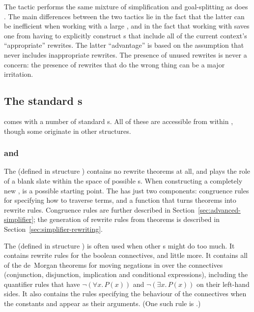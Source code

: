 The  tactic performs the same mixture of simplification and
goal-splitting as does .  The main differences between the
two tactics lie in the fact that the latter can be inefficient when
working with a large , and in the fact that working with
 saves one from having to explicitly construct
\simpset{}s that include all of the current context's ``appropriate''
rewrites.  The latter ``advantage'' is based on the assumption that
 never includes inappropriate rewrites.  The presence
of unused rewrites is never a concern: the presence of rewrites that
do the wrong thing can be a major irritation.

\subsection{The standard \simpset{}s}
\label{sec:standard-simpsets}

\HOL{} comes with a number of standard \simpset{}s.  All of these are
accessible from within , though some originate in other
structures.

\subsubsection{ and }
\label{sec:purebool-ss}
%
%
The  \simpset{} (defined in structure )
contains no rewrite theorems at all, and plays the role of a blank
slate within the space of possible \simpset{}s.  When constructing a
completely new \simpset,  is a possible starting point.
The  \simpset{} has just two components: congruence rules
for specifying how to traverse terms, and a function that turns
theorems into rewrite rules.  Congruence rules are further described
in Section~\ref{sec:advanced-simplifier}; the generation of rewrite
rules from theorems is described in
Section~\ref{sec:simplifier-rewriting}.

%
The  \simpset{} (defined in structure ) is
often used when other \simpset{}s might do too much.  It contains
rewrite rules for the boolean connectives, and little more.  It
contains all of the de~Morgan theorems for moving negations in over
the connectives (conjunction, disjunction, implication and conditional
expressions), including the quantifier rules that have $\neg(\forall
x.\,P(x))$ and $\neg(\exists x.\,P (x))$ on their left-hand sides.  It
also contains the rules specifying the behaviour of the connectives
when the constants  and  appear as their
arguments.  (One such rule is .)

